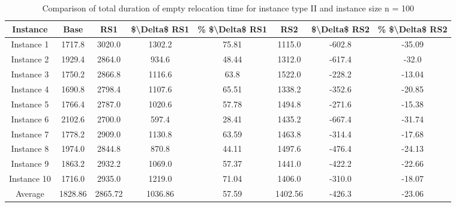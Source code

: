 \begin{table}[H]
\centering
\begin{tabular}{cccccccc}
  \hline
  \textbf{Instance} & \textbf{Base} & \textbf{RS1} & \textbf{\$\textbackslash{}Delta\$  RS1} & \textbf{\% \$\textbackslash{}Delta\$  RS1} & \textbf{RS2} & \textbf{\$\textbackslash{}Delta\$  RS2} & \textbf{\% \$\textbackslash{}Delta\$  RS2} \\\hline
  Instance 1 & 1717.8 & 3020.0 & 1302.2 & 75.81 & 1115.0 & -602.8 & -35.09 \\
  Instance 2 & 1929.4 & 2864.0 & 934.6 & 48.44 & 1312.0 & -617.4 & -32.0 \\
  Instance 3 & 1750.2 & 2866.8 & 1116.6 & 63.8 & 1522.0 & -228.2 & -13.04 \\
  Instance 4 & 1690.8 & 2798.4 & 1107.6 & 65.51 & 1338.2 & -352.6 & -20.85 \\
  Instance 5 & 1766.4 & 2787.0 & 1020.6 & 57.78 & 1494.8 & -271.6 & -15.38 \\
  Instance 6 & 2102.6 & 2700.0 & 597.4 & 28.41 & 1435.2 & -667.4 & -31.74 \\
  Instance 7 & 1778.2 & 2909.0 & 1130.8 & 63.59 & 1463.8 & -314.4 & -17.68 \\
  Instance 8 & 1974.0 & 2844.8 & 870.8 & 44.11 & 1497.6 & -476.4 & -24.13 \\
  Instance 9 & 1863.2 & 2932.2 & 1069.0 & 57.37 & 1441.0 & -422.2 & -22.66 \\
  Instance 10 & 1716.0 & 2935.0 & 1219.0 & 71.04 & 1406.0 & -310.0 & -18.07 \\
  Average & 1828.86 & 2865.72 & 1036.86 & 57.59 & 1402.56 & -426.3 & -23.06 \\\hline
\end{tabular}
\caption{Comparison of total duration of empty relocation time for instance type II and instance size n = 100}
\label{tab:wait:resrelocation-empty-relocation-comparison_II_100}
\end{table}
